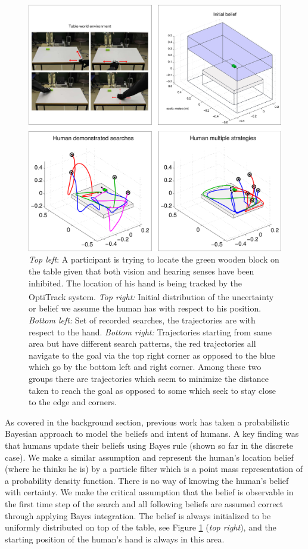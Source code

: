 \begin{figure}
\centering
  \includegraphics[width=\textwidth]{./ch3-Search/Figures/Figure2}
  \caption{\textit{Top left}: A participant is trying to locate the green wooden block on the table
given that both vision and hearing senses have been inhibited. The location of his hand is being tracked by the
OptiTrack\textsuperscript{\textregistered} system. \textit{Top right:} Initial distribution of the uncertainty or belief we assume
the human has with respect to his position. \textit{Bottom left:} Set of recorded searches, the trajectories are with respect to the hand.
\textit{Bottom right:} Trajectories starting from same area but have different search patterns, the red trajectories all navigate to the goal
via the top right corner as opposed to the blue which go by the bottom left and right corner. Among these two groups there are trajectories which
seem to minimize the distance taken to reach the goal as opposed to some which seek to stay close to the edge and corners.}
\label{fig:experiment}
\end{figure}


As covered in the background section, previous work has taken a probabilistic Bayesian approach to model the beliefs and intent 
of humans. A key finding was that humans update their beliefs using Bayes rule (shown so far in the discrete case). 
We make a similar assumption and represent the human's location belief (where he thinks he is) by a particle filter which
is a point mass representation of a probability density function. There is no way of
knowing the human's belief with certainty. We make the critical assumption that the belief is observable in the first time step of the search and all following beliefs 
are assumed correct through applying Bayes integration.
The belief is always initialized to be uniformly distributed on top of the table, 
see Figure \ref{fig:experiment} (\textit{top right}), and the starting position of the human's hand is always in this area.

